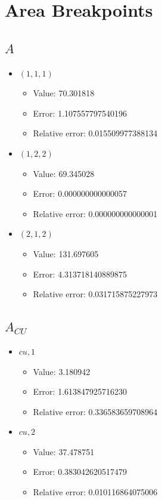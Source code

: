\documentclass{article}%
\begin{document}
\section{Area Breakpoints}%
\thispagestyle{plain}%
\subsection{$A$}%
\begin{itemize}%
	\item $(1, 1, 1)$%
	\begin{itemize}%
		\item Value: 70.301818%
		\item Error: 1.107557797540196%
		\item Relative error: 0.015509977388134%
	\end{itemize}%
	\item $(1, 2, 2)$%
	\begin{itemize}%
		\item Value: 69.345028%
		\item Error: 0.000000000000057%
		\item Relative error: 0.000000000000001%
	\end{itemize}%
	\item $(2, 1, 2)$%
	\begin{itemize}%
		\item Value: 131.697605%
		\item Error: 4.313718140889875%
		\item Relative error: 0.031715875227973%
	\end{itemize}%
\end{itemize}%
\subsection{$A_{CU}$}%
\begin{itemize}%
	\item $\textit{cu},1$%
	\begin{itemize}%
		\item Value: 3.180942%
		\item Error: 1.613847925716230%
		\item Relative error: 0.336583659708964%
	\end{itemize}%
	\item $\textit{cu},2$%
	\begin{itemize}%
		\item Value: 37.478751%
		\item Error: 0.383042620517479%
		\item Relative error: 0.010116864075006%
	\end{itemize}%
\end{itemize}%
\end{document}
